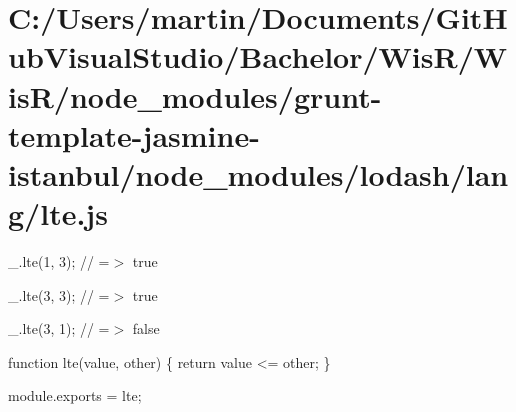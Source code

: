 \hypertarget{_c_1_2_users_2martin_2_documents_2_git_hub_visual_studio_2_bachelor_2_wis_r_2_wis_r_2node_moduleeeb1644726c802eb314faf4906f79839}{}\section{C\+:/\+Users/martin/\+Documents/\+Git\+Hub\+Visual\+Studio/\+Bachelor/\+Wis\+R/\+Wis\+R/node\+\_\+modules/grunt-\/template-\/jasmine-\/istanbul/node\+\_\+modules/lodash/lang/lte.\+js}
\+\_\+.\+lte(1, 3); // =$>$ true

\+\_\+.\+lte(3, 3); // =$>$ true

\+\_\+.\+lte(3, 1); // =$>$ false


\begin{DoxyCodeInclude}

\textcolor{keyword}{function} lte(value, other) \{
  \textcolor{keywordflow}{return} value <= other;
\}

module.exports = lte;
\end{DoxyCodeInclude}
 